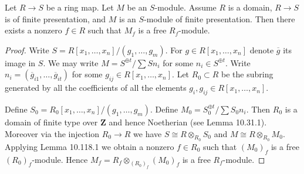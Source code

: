 \begin{lemma}
Let $R\to S$ be a ring map. Let $M$ be an $S$-module. Assume $R$ is a domain, $R\to S$ is of finite presentation, and $M$ is an $S$-module of finite presentation. Then there exists a nonzero $f\in R$ such that $M_f$ is a free $R_f$-module.
\end{lemma}
\begin{proof}
Write $S=R[x_1,\ldots,x_n]/(g_1,\ldots,g_m)$. For $g\in R[x_1,\ldots,x_n]$ denote $\overline g$ its image in $S$. We may write $M=S^{\oplus t}/\sum Sn_i$ for some $n_i\in S^{\oplus t}$. Write $n_i=(\overline g_{i1},\ldots,\overline g_{it})$ for some $g_{ij}\in R[x_1,\ldots,x_n]$. Let $R_0\subset R$ be the subring generated by all the coefficients of all the elements $g_i,g_{ij}\in R[x_1,\ldots,x_n]$.

Define $S_0=R_0[x_1,\ldots,x_n]/(g_1,\ldots,g_m)$. Define $M_0=S_0^{\oplus t}/\sum S_0n_i$. Then $R_0$ is a domain of finite type over $\mathbf Z$ and hence Noetherian (see Lemma 10.31.1). Moreover via the injection $R_0\to R$ we have $S\cong R\otimes_{R_0}S_0$ and $M\cong R\otimes_{R_0}M_0$. Applying Lemma 10.118.1 we obtain a nonzero $f\in R_0$ such that $(M_0)_f$ is a free $(R_0)_f$-module. Hence $M_f=R_f\otimes_{(R_0)_f}(M_0)_f$ is a free $R_f$-module.
\end{proof}
